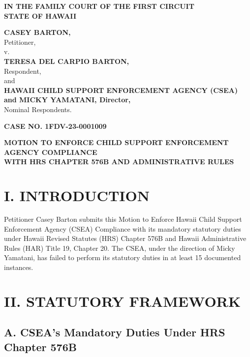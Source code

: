\documentclass[12pt]{article}
\title{}
\author{}
\date{}
\begin{document}
\vspace*{-0.5in}

\begin{center}
\textbf{IN THE FAMILY COURT OF THE FIRST CIRCUIT\\STATE OF HAWAII}

\vspace{0.2in}

\textbf{CASEY BARTON,}\\Petitioner,\\v.\\\textbf{TERESA DEL CARPIO BARTON,}\\Respondent,\\and\\\textbf{HAWAII CHILD SUPPORT ENFORCEMENT AGENCY (CSEA)\\and MICKY YAMATANI, Director,}\\Nominal Respondents.
\end{center}

\begin{flushright}
\textbf{CASE NO. 1FDV-23-0001009}
\end{flushright}

\begin{center}
\textbf{MOTION TO ENFORCE CHILD SUPPORT ENFORCEMENT AGENCY COMPLIANCE\\WITH HRS CHAPTER 576B AND ADMINISTRATIVE RULES}
\end{center}

\vspace{0.2in}

\section*{I. INTRODUCTION}

Petitioner Casey Barton submits this Motion to Enforce Hawaii Child Support Enforcement Agency (CSEA) Compliance with its mandatory statutory duties under Hawaii Revised Statutes (HRS) Chapter 576B and Hawaii Administrative Rules (HAR) Title 19, Chapter 20. The CSEA, under the direction of Micky Yamatani, has failed to perform its statutory duties in at least 15 documented instances.

\section*{II. STATUTORY FRAMEWORK}

\subsection*{A. CSEA's Mandatory Duties Under HRS Chapter 576B}
\end{document}
